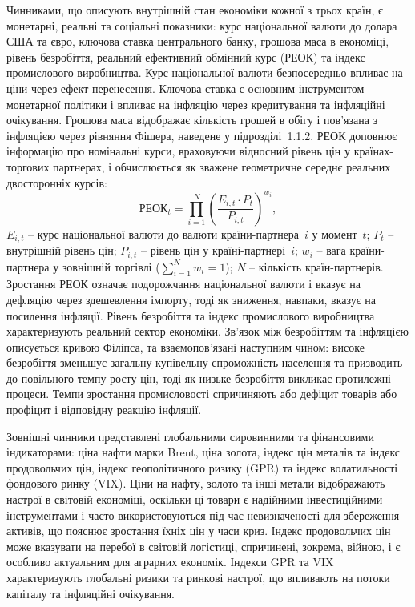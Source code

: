 \documentclass{bachelor_thesis}
\begin{document}
Чинниками, що описують внутрішній стан економіки кожної з трьох країн, є монетарні, реальні та соціальні показники: курс національної валюти до долара США та євро, ключова ставка центрального банку, грошова маса в економіці, рівень безробіття, реальний ефективний обмінний курс (РЕОК) та індекс промислового виробництва. Курс національної валюти безпосередньо впливає на ціни через ефект перенесення. Ключова ставка є основним інструментом монетарної політики і впливає на інфляцію через кредитування та інфляційні очікування. Грошова маса відображає кількість грошей в обігу і пов'язана з інфляцією через рівняння Фішера, наведене у підрозділі~1.1.2. РЕОК доповнює інформацію про номінальні курси, враховуючи відносний рівень цін у країнах-торгових партнерах, і обчислюється як зважене геометричне середнє реальних двосторонніх курсів:
\begin{equation*}
\text{РЕОК}_t = \prod_{i=1}^{N} \left(\frac{E_{i,t} \cdot P_t}{P_{i,t}}\right)^{w_i},
\end{equation*}
 $E_{i,t}$ -- курс національної валюти до валюти країни-партнера~$i$ у момент~$t$; $P_t$ -- внутрішній рівень цін; $P_{i,t}$ -- рівень цін у країні-партнері~$i$; $w_i$ -- вага країни-партнера у зовнішній торгівлі ($\sum_{i=1}^{N} w_i = 1$); $N$ -- кількість країн-партнерів. Зростання РЕОК означає подорожчання національної валюти і вказує на дефляцію через здешевлення імпорту, тоді як зниження, навпаки, вказує на посилення інфляції.
 Рівень безробіття та індекс промислового виробництва характеризують реальний сектор економіки. Зв'язок між безробіттям та інфляцією описується кривою Філіпса, та взаємопов'язані наступним чином: високе безробіття зменьшує загальну купівельну спроможність населення та призводить до повільного темпу росту цін, тоді як низьке безробіття викликає протилежні процеси. Темпи зростання промисловості спричиняють або дефіцит товарів або профіцит і відповідну реакцію інфляції.

Зовнішні чинники представлені глобальними сировинними та фінансовими індикаторами: ціна нафти марки Brent, ціна золота, індекс цін металів та індекс продовольчих цін, індекс геополітичного ризику (GPR) та індекс волатильності фондового ринку (VIX). Ціни на нафту, золото та інші метали відображають настрої в світовій економіці, оскільки ці товари є надійними інвестиційними інструментами і часто використовуються під час невизначеності для збереження активів, що пояснює зростання їхніх цін у часи криз. Індекс продовольчих цін може вказувати на перебої в світовій логістиці, спричинені, зокрема, війною, і є особливо актуальним для аграрних економік. Індекси GPR та VIX характеризують глобальні ризики та ринкові настрої, що впливають на потоки капіталу та інфляційні очікування.
\end{document}
